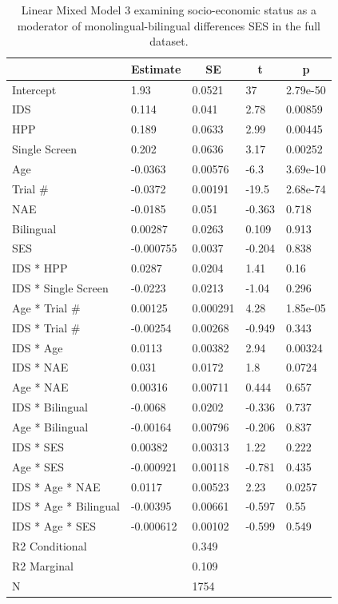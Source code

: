\documentclass[,man,floatsintext]{apa6}
\begin{document}
\begin{table}[tbp]
\begin{center}
\begin{threeparttable}
\caption{\label{tab:unnamed-chunk-14}Linear Mixed Model 3 examining socio-economic status as a moderator of monolingual-bilingual differences SES in the full dataset.}
\begin{tabular}{lllll}
\toprule
 & \multicolumn{1}{c}{Estimate} & \multicolumn{1}{c}{SE} & \multicolumn{1}{c}{t} & \multicolumn{1}{c}{p}\\
\midrule
Intercept & 1.93 & 0.0521 & 37 & 2.79e-50\\
IDS & 0.114 & 0.041 & 2.78 & 0.00859\\
HPP & 0.189 & 0.0633 & 2.99 & 0.00445\\
Single Screen & 0.202 & 0.0636 & 3.17 & 0.00252\\
Age & -0.0363 & 0.00576 & -6.3 & 3.69e-10\\
Trial \# & -0.0372 & 0.00191 & -19.5 & 2.68e-74\\
NAE & -0.0185 & 0.051 & -0.363 & 0.718\\
Bilingual & 0.00287 & 0.0263 & 0.109 & 0.913\\
SES & -0.000755 & 0.0037 & -0.204 & 0.838\\
IDS * HPP & 0.0287 & 0.0204 & 1.41 & 0.16\\
IDS * Single Screen & -0.0223 & 0.0213 & -1.04 & 0.296\\
Age * Trial \# & 0.00125 & 0.000291 & 4.28 & 1.85e-05\\
IDS * Trial \# & -0.00254 & 0.00268 & -0.949 & 0.343\\
IDS * Age & 0.0113 & 0.00382 & 2.94 & 0.00324\\
IDS * NAE & 0.031 & 0.0172 & 1.8 & 0.0724\\
Age * NAE & 0.00316 & 0.00711 & 0.444 & 0.657\\
IDS * Bilingual & -0.0068 & 0.0202 & -0.336 & 0.737\\
Age * Bilingual & -0.00164 & 0.00796 & -0.206 & 0.837\\
IDS * SES & 0.00382 & 0.00313 & 1.22 & 0.222\\
Age * SES & -0.000921 & 0.00118 & -0.781 & 0.435\\
IDS * Age * NAE & 0.0117 & 0.00523 & 2.23 & 0.0257\\
IDS * Age * Bilingual & -0.00395 & 0.00661 & -0.597 & 0.55\\
IDS * Age * SES & -0.000612 & 0.00102 & -0.599 & 0.549\\ \midrule
R2 Conditional &  & 0.349 &  & \\
R2 Marginal &  & 0.109 &  & \\ \midrule
N &  & 1754 &  & \\
\bottomrule
\end{tabular}
\end{threeparttable}
\end{center}
\end{table}
\end{document}

